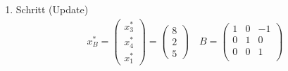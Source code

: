 \documentclass[a4paper]{scrartcl}
\begin{document}
\begin{enumerate}[label=\bfseries\arabic*.]
\begin{enumerate}
\begin{enumerate}[1.]
\begin{enumerate}[1.]
                            \item Schritt (Update)
                                \begin{gather}
                                    x_B^* =
                                    \begin{pmatrix}
                                        x_3^* \\ x_4^* \\ x_1^*
                                    \end{pmatrix}
                                    =
                                    \begin{pmatrix}
                                        8 \\ 2 \\ 5
                                    \end{pmatrix}
                                    \quad
                                    B =
                                    \begin{pmatrix}
                                        1 & 0 & -1 \\
                                        0 & 1 & 0 \\
                                        0 & 0 & 1 \\
                                    \end{pmatrix}
                                \end{gather}

                        \end{enumerate}


\end{enumerate}
\end{enumerate}
\end{enumerate}
\end{document}
